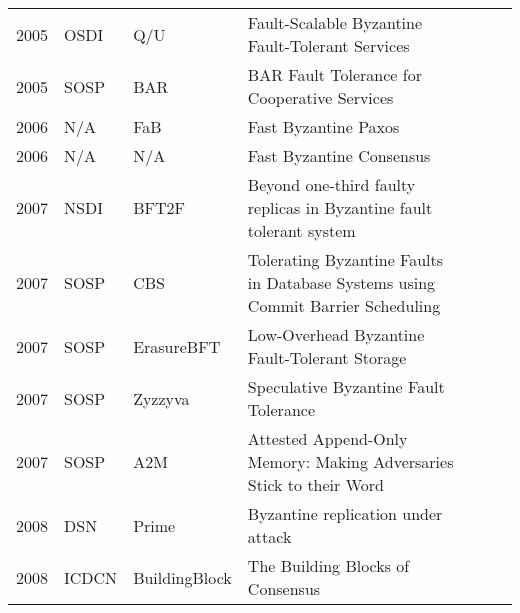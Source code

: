 \documentclass{article}
\begin{document}
\begin{landscape}
\begin{table}[]
{\begin{tabular}{llll|l|l|l|}
2005 & OSDI              & Q/U                     & Fault-Scalable Byzantine Fault-Tolerant Services                                          &            &          &              \\ \cline{5-7} 
2005 & SOSP              & BAR                     & BAR Fault Tolerance for Cooperative Services                                              &            &          &              \\ \cline{5-7} 
2006 & N/A               & FaB                     & Fast Byzantine Paxos                                                                      &            &          &              \\ \cline{5-7} 
2006 & N/A               & N/A                     & Fast Byzantine Consensus                                                                  &            &          &              \\ \cline{5-7} 
2007 & NSDI              & BFT2F                   & Beyond one-third faulty replicas in Byzantine fault tolerant system                       &            &          &              \\ \cline{5-7} 
2007 & SOSP              & CBS                     & Tolerating Byzantine Faults in Database Systems using Commit Barrier Scheduling           &            &          &              \\ \cline{5-7} 
2007 & SOSP              & ErasureBFT              & Low-Overhead Byzantine Fault-Tolerant Storage                                             &            &          &              \\ \cline{5-7} 
2007 & SOSP              & Zyzzyva                 & Speculative Byzantine Fault Tolerance                                                     &            &          &              \\ \cline{5-7} 
2007 & SOSP              & A2M                     & Attested Append-Only Memory: Making Adversaries Stick to their Word                       &            &          &              \\ \cline{5-7} 
2008 & DSN               & Prime                   & Byzantine replication under attack                                                        &            &          &              \\ \cline{5-7} 
2008 & ICDCN             & BuildingBlock           & The Building Blocks of Consensus                                                          &            &          &              \\ \cline{5-7} 

\end{tabular}}
\end{table}
\end{landscape}
\end{document}
